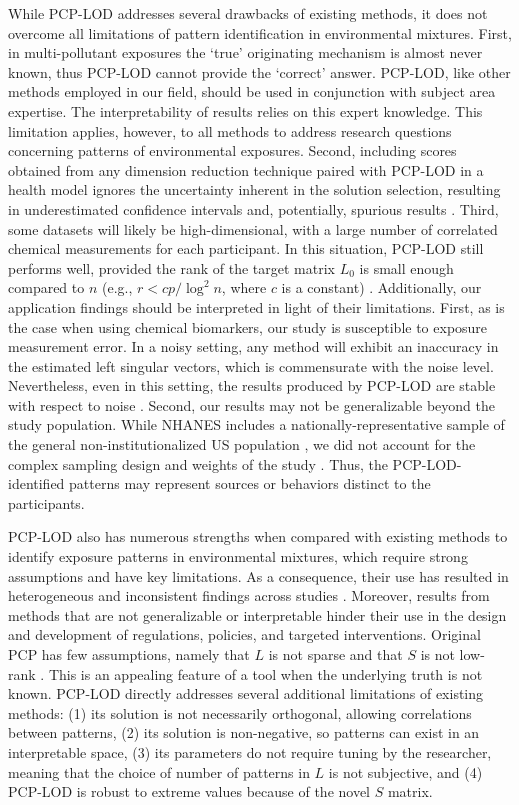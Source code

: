 While PCP-LOD addresses several drawbacks of existing methods, it does not overcome all limitations of pattern identification in environmental mixtures. First, in multi-pollutant exposures the `true' originating mechanism is almost never known, thus PCP-LOD cannot provide the `correct' answer. PCP-LOD, like other methods employed in our field, should be used in conjunction with subject area expertise. The interpretability of results relies on this expert knowledge. This limitation applies, however, to all methods to address research questions concerning patterns of environmental exposures. Second, including scores obtained from any dimension reduction technique paired with PCP-LOD in a health model ignores the uncertainty inherent in the solution selection, resulting in underestimated confidence intervals and, potentially, spurious results \citep{mak14_unc}. Third, some datasets will likely be high-dimensional, with a large number of correlated chemical measurements for each participant. In this situation, PCP-LOD still performs well, provided the rank of the target matrix $L_{0}$ is small enough compared to $n$ (e.g., $r<c p / \log ^{2} n$, where $c$ is a constant) \citep{zhou2010stable}. Additionally, our application findings should be interpreted in light of their limitations. First, as is the case when using chemical biomarkers, our study is susceptible to exposure measurement error. In a noisy setting, any method will exhibit an inaccuracy in the estimated left singular vectors, which is commensurate with the noise level. Nevertheless, even in this setting, the results produced by PCP-LOD are stable with respect to noise \citep{zhou2010stable}. Second, our results may not be generalizable beyond the study population. While NHANES includes a nationally-representative sample of the general non-institutionalized US population \citep{johnson2013national}, we did not account for the complex sampling design and weights of the study \citep{curtin2012national}. Thus, the PCP-LOD-identified patterns may represent sources or behaviors distinct to the participants. 

PCP-LOD also has numerous strengths when compared with existing methods to identify exposure patterns in environmental mixtures, which require strong assumptions and have key limitations. As a consequence, their use has resulted in heterogeneous and inconsistent findings across studies \citep{gibson2019complex}. Moreover, results from methods that are not generalizable or interpretable hinder their use in the design and development of regulations, policies, and targeted interventions. Original PCP has few assumptions, namely that $L$ is not sparse and that $S$ is not low-rank \citep{candes2011robust}. This is an appealing feature of a tool when the underlying truth is not known. PCP-LOD directly addresses several additional limitations of existing methods: (1) its solution is not necessarily orthogonal, allowing correlations between patterns, (2) its solution is non-negative, so patterns can exist in an interpretable space, (3) its parameters do not require tuning by the researcher, meaning that the choice of number of patterns in $L$ is not subjective, and (4) PCP-LOD is robust to extreme values because of the novel $S$ matrix.

